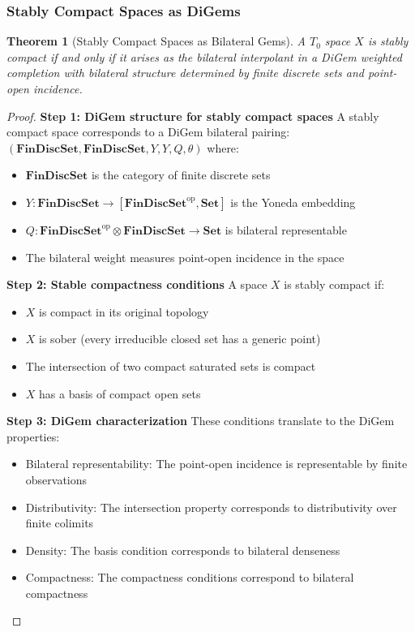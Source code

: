 \documentclass[11pt]{article}
\theoremstyle{plain}
\newtheorem{theorem}{Theorem}[section]
\theoremstyle{definition}
\theoremstyle{remark}
\newcommand{\op}{\mathrm{op}}
\begin{document}
\subsubsection{Stably Compact Spaces as DiGems}

\begin{theorem}[Stably Compact Spaces as Bilateral Gems]\label{thm:stably-compact-digems}
A $T_0$ space $X$ is stably compact if and only if it arises as the bilateral interpolant in a DiGem weighted completion with bilateral structure determined by finite discrete sets and point-open incidence.
\end{theorem}

\begin{proof}
\textbf{Step 1: DiGem structure for stably compact spaces}
A stably compact space corresponds to a DiGem bilateral pairing:
$(\mathbf{FinDiscSet}, \mathbf{FinDiscSet}, Y, Y, Q, \theta)$ where:
\begin{itemize}
\item $\mathbf{FinDiscSet}$ is the category of finite discrete sets
\item $Y : \mathbf{FinDiscSet} \to [\mathbf{FinDiscSet}^{\op}, \mathbf{Set}]$ is the Yoneda embedding  
\item $Q : \mathbf{FinDiscSet}^{\op} \otimes \mathbf{FinDiscSet} \to \mathbf{Set}$ is bilateral representable
\item The bilateral weight measures point-open incidence in the space
\end{itemize}

\textbf{Step 2: Stable compactness conditions}
A space $X$ is stably compact if:
\begin{itemize}
\item $X$ is compact in its original topology
\item $X$ is sober (every irreducible closed set has a generic point)  
\item The intersection of two compact saturated sets is compact
\item $X$ has a basis of compact open sets
\end{itemize}

\textbf{Step 3: DiGem characterization}
These conditions translate to the DiGem properties:
\begin{itemize}
\item Bilateral representability: The point-open incidence is representable by finite observations
\item Distributivity: The intersection property corresponds to distributivity over finite colimits
\item Density: The basis condition corresponds to bilateral denseness
\item Compactness: The compactness conditions correspond to bilateral compactness
\end{itemize}


\end{proof}
\end{document}

